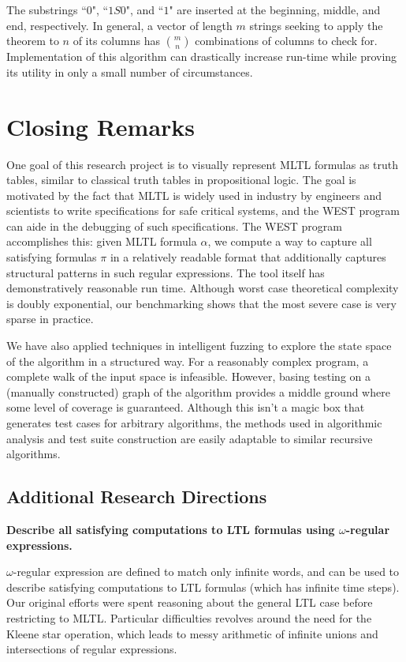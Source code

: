 \documentclass[runningheads]{llncs}
\begin{document}
The substrings ``$0$", ``$1S0$", and ``$1$" are inserted at the beginning, middle, and end, respectively. In general, a vector of length $m$ strings seeking to apply the theorem to $n$ of its columns has $m \choose n$ combinations of columns to check for. Implementation of this algorithm can drastically increase run-time while proving its utility in only a small number of circumstances.


\section{Closing Remarks}
\label{Conclusion}
 One goal of this research project is to visually represent MLTL formulas as truth tables, similar to classical truth tables in propositional logic. 
The goal is motivated by the fact that MLTL is widely used in industry by engineers and scientists to write specifications for safe critical systems, and the WEST program can aide in the debugging of such specifications. 
The WEST program accomplishes this: given MLTL formula $\alpha$, we compute a way to capture all satisfying formulas $\pi$ in a relatively readable format that additionally captures structural patterns in such regular expressions. 
The tool itself has demonstratively reasonable run time. 
Although worst case theoretical complexity is doubly exponential, our benchmarking shows that the most severe case is very sparse in practice. 

We have also applied techniques in intelligent fuzzing to explore the state space of the algorithm in a structured way. 
For a reasonably complex program, a complete walk of the input space is infeasible. 
However, basing testing on a (manually constructed) graph of the algorithm provides a middle ground where some level of coverage is guaranteed. 
Although this isn't a magic box that generates test cases for arbitrary algorithms, the methods used in algorithmic analysis and test suite construction are easily adaptable to similar recursive algorithms.

\subsection{Additional Research Directions}
\textbf{Describe all satisfying computations to LTL formulas using $\omega$-regular expressions.}

$\omega$-regular expression are defined to match only infinite words, and can be used to describe satisfying computations to LTL formulas (which has infinite time steps). 
Our original efforts were spent reasoning about the general LTL case before restricting to MLTL. Particular difficulties revolves around the need for the Kleene star operation, which leads to messy arithmetic of infinite unions and intersections of regular expressions. \\
\end{document}
